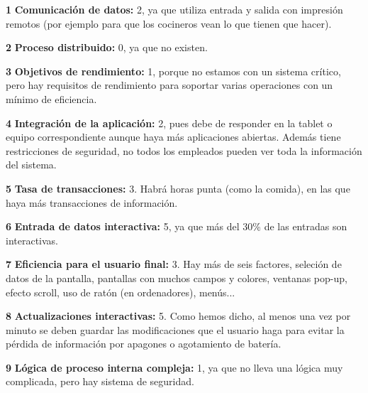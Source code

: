 \documentclass[spanish,a4paper,11pt, twoside]{report}	%
\begin{document}
	\textbf{1} \textbf{Comunicación de datos:} 2, ya que utiliza entrada y salida con impresión remotos (por ejemplo para que los cocineros vean lo que tienen que hacer).
	
	\vspace{0.15cm}
 
	\textbf{2} \textbf{Proceso distribuido:} 0, ya que no existen.
	
	\vspace{0.15cm}
 
	\textbf{3} \textbf{Objetivos de rendimiento:} 1, porque no estamos con un sistema crítico, pero hay requisitos de rendimiento para soportar varias operaciones con un mínimo de eficiencia.
	
	\vspace{0.15cm}
 
	\textbf{4} \textbf{Integración de la aplicación:} 2, pues debe de responder en la tablet o equipo correspondiente aunque haya más aplicaciones abiertas. Además tiene restricciones de seguridad, no todos los empleados pueden ver toda la información del sistema.
	
	\vspace{0.15cm}
 
	\textbf{5} \textbf{Tasa de transacciones:} 3. Habrá horas punta (como la comida), en las que haya más transacciones de información.
	
	\vspace{0.15cm}
 
	\textbf{6} \textbf{Entrada de datos interactiva:} 5, ya que más del 30\% de las entradas son interactivas.
	
	\vspace{0.15cm}
 
	\textbf{7} \textbf{Eficiencia para el usuario final:} 3. Hay más de seis factores, seleción de datos de la pantalla, pantallas con muchos campos y colores, ventanas pop-up, efecto scroll, uso de ratón (en ordenadores), menús...
	
	\vspace{0.15cm}
 
	\textbf{8} \textbf{Actualizaciones interactivas:} 5. Como hemos dicho, al menos una vez por minuto se deben guardar las modificaciones que el usuario haga para evitar la pérdida de información por apagones o agotamiento de batería.
	
	\vspace{0.15cm}
 
	\textbf{9} \textbf{Lógica de proceso interna compleja:} 1, ya que no lleva una lógica muy complicada,  pero hay sistema de seguridad.
	
\end{document}
